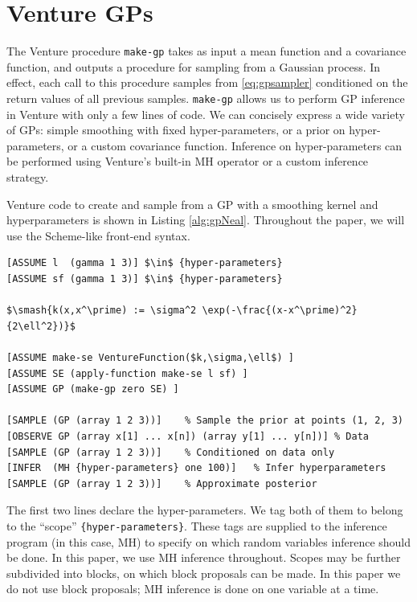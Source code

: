 \documentclass{article} %
\begin{document}
\section{Venture GPs}
The Venture procedure \texttt{make-gp} takes as input a mean function and a covariance function, and outputs a procedure for sampling from a Gaussian process.
In effect, each call to this procedure samples from \eqref{eq:gpsampler} conditioned on the return values of all previous samples.
\texttt{make-gp} allows us to perform GP inference in Venture with only a few lines of code.
We can concisely express a wide variety of GPs: simple smoothing with fixed hyper-parameters, or a prior on hyper-parameters, or a custom covariance function.
Inference on hyper-parameters can be performed using Venture's built-in MH operator or a custom inference strategy.

Venture code to create and sample from a GP with a smoothing kernel and hyperparameters is shown in Listing \ref{alg:gpNeal}.
Throughout the paper, we will use the Scheme-like front-end syntax.
\begin{minipage}{\linewidth}
\footnotesize
\belowcaptionskip=-10pt
\begin{lstlisting}[frame=single,caption=Bayesian GP Smoothing,mathescape,label=alg:gpNeal]
[ASSUME l  (gamma 1 3)] $\in$ {hyper-parameters} 
[ASSUME sf (gamma 1 3)] $\in$ {hyper-parameters}

$\smash{k(x,x^\prime) := \sigma^2 \exp(-\frac{(x-x^\prime)^2}{2\ell^2})}$

[ASSUME make-se VentureFunction($k,\sigma,\ell$) ]
[ASSUME SE (apply-function make-se l sf) ]
[ASSUME GP (make-gp zero SE) ]

[SAMPLE (GP (array 1 2 3))]    % Sample the prior at points (1, 2, 3)
[OBSERVE GP (array x[1] ... x[n]) (array y[1] ... y[n])] % Data
[SAMPLE (GP (array 1 2 3))]    % Conditioned on data only
[INFER  (MH {hyper-parameters} one 100)]   % Infer hyperparameters
[SAMPLE (GP (array 1 2 3))]    % Approximate posterior

\end{lstlisting}
\end{minipage}

The first two lines declare the hyper-parameters.
We tag both of them to belong to the ``scope'' \texttt{\{hyper-parameters\}}.
These tags are supplied to the inference program (in this case, MH) to specify on which random variables inference should be done.
In this paper, we use MH inference throughout.
Scopes may be further subdivided into blocks, on which block proposals can be made.
In this paper we do not use block proposals; MH inference is done on one variable at a time.
\end{document}
